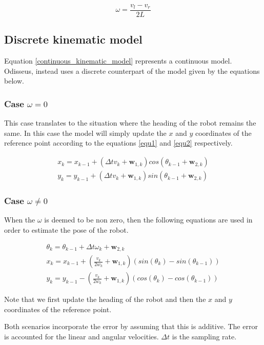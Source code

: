 \begin{equation}
\omega = \frac{v_l - v_r}{2L}
\label{odisseus_angular_velocity}
\end{equation}

\subsection{Discrete kinematic model}
\label{discrete_kinematic model}
Equation \ref{continuous_kinematic_model} represents a continuous model. Odisseus, instead uses a discrete
counterpart of the model given by the equations below. 

\subsubsection{Case $\omega=0$}
This case translates to the situation where the heading of the robot remains the same.
In this case the model will simply update the $x$ and $y$ coordinates of the reference point 
according to the equations \ref{equ1} and \ref{equ2} respectively.

\begin{eqnarray}
x_k = x_{k-1} + (\Delta t v_k + \mathbf{w}_{1,k})cos(\theta_{k-1} + \mathbf{w}_{2,k}) \label{equ1} \\
y_k = y_{k-1} + (\Delta t v_k + \mathbf{w}_{1,k})sin(\theta_{k-1} + \mathbf{w}_{2,k}) \label{equ2}
\end{eqnarray} 

\subsubsection{Case $\omega \neq 0$}
When the $\omega$ is deemed to be non zero, then the following equations are used
in order to estimate the pose of the robot.

\begin{eqnarray}
\theta_k = \theta_{k -1} + \Delta t \omega_k + \mathbf{w}_{2,k} \\
\label{equ3}
x_k = x_{k-1} + (\frac{v_k}{2w_k} + \mathbf{w}_{1,k})(sin(\theta_k) - sin(\theta_{k-1})) \label{equ4} \\
y_k = y_{k-1} - (\frac{v_k}{2w_k} + \mathbf{w}_{1,k})(cos(\theta_{k}) - cos(\theta_{k-1})) \label{equ5}
\end{eqnarray}

Note that we first update the heading of the robot and then the $x$ and $y$ coordinates
of the reference point.

Both scenarios incorporate the error by assuming that this is additive. The error is accounted for
the linear and angular velocities. $\Delta t$ is the sampling rate. 